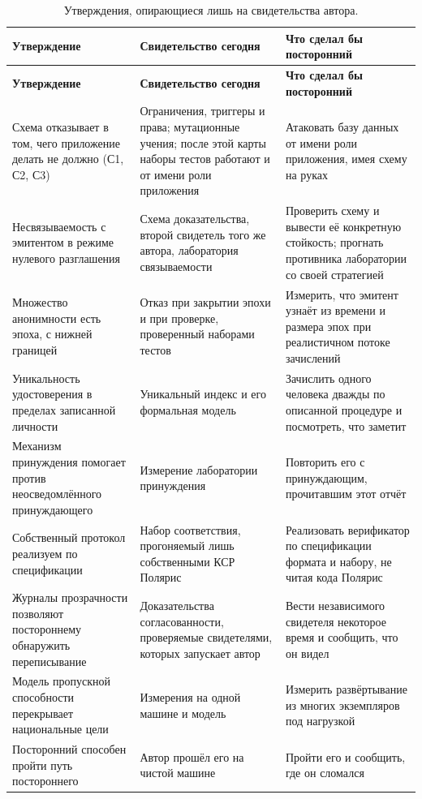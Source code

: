 {\footnotesize
\setlength{\tabcolsep}{4pt}\renewcommand{\arraystretch}{1.12}
\begin{xltabular}{\textwidth}{>{\RaggedRight\arraybackslash\hspace{0pt}}p{1.7in} >{\RaggedRight\arraybackslash\hspace{0pt}}X >{\RaggedRight\arraybackslash\hspace{0pt}}p{1.9in}}
\caption{Утверждения, опирающиеся лишь на свидетельства автора.}\label{tab:untested}\\
\toprule
\textbf{Утверждение} & \textbf{Свидетельство сегодня} & \textbf{Что сделал бы посторонний} \\
\midrule
\endfirsthead
\toprule
\textbf{Утверждение} & \textbf{Свидетельство сегодня} & \textbf{Что сделал бы посторонний} \\
\midrule
\endhead
Схема отказывает в том, чего приложение делать не должно (С1, С2, С3) & Ограничения, триггеры и права; мутационные учения; после этой карты наборы тестов работают и от имени роли приложения & Атаковать базу данных от имени роли приложения, имея схему на руках \\
Несвязываемость с эмитентом в режиме нулевого разглашения & Схема доказательства, второй свидетель того же автора, лаборатория связываемости & Проверить схему и вывести её конкретную стойкость; прогнать противника лаборатории со своей стратегией \\
Множество анонимности есть эпоха, с нижней границей & Отказ при закрытии эпохи и при проверке, проверенный наборами тестов & Измерить, что эмитент узнаёт из времени и размера эпох при реалистичном потоке зачислений \\
Уникальность удостоверения в пределах записанной личности & Уникальный индекс и его формальная модель & Зачислить одного человека дважды по описанной процедуре и посмотреть, что заметит \\
Механизм принуждения помогает против неосведомлённого принуждающего & Измерение лаборатории принуждения & Повторить его с принуждающим, прочитавшим этот отчёт \\
Собственный протокол реализуем по спецификации & Набор соответствия, прогоняемый лишь собственными КСР Полярис & Реализовать верификатор по спецификации формата и набору, не читая кода Полярис \\
Журналы прозрачности позволяют постороннему обнаружить переписывание & Доказательства согласованности, проверяемые свидетелями, которых запускает автор & Вести независимого свидетеля некоторое время и сообщить, что он видел \\
Модель пропускной способности перекрывает национальные цели & Измерения на одной машине и модель & Измерить развёртывание из многих экземпляров под нагрузкой \\
Посторонний способен пройти путь постороннего & Автор прошёл его на чистой машине & Пройти его и сообщить, где он сломался \\
\bottomrule
\end{xltabular}
}

